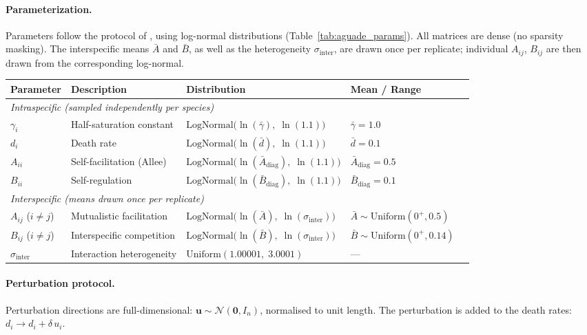 \documentclass[pdflatex,sn-mathphys-num]{sn-jnl}%
\begin{document}
\paragraph{Parameterization.} Parameters follow the protocol of \cite{aguade-gorgorio_taxonomy_2024}, using log-normal distributions (Table~\ref{tab:aguade_params}). All matrices are dense (no sparsity masking). The interspecific means $\bar{A}$ and $\bar{B}$, as well as the heterogeneity $\sigma_{\mathrm{inter}}$, are drawn once per replicate; individual $A_{ij}$, $B_{ij}$ are then drawn from the corresponding log-normal.
\begin{center}
\begin{tabular}{lllll}
\hline
Parameter & Description & Distribution & Mean / Range \\
\hline
\multicolumn{4}{l}{\emph{Intraspecific (sampled independently per species)}} \\
$\gamma_i$ & Half-saturation constant & $\mathrm{LogNormal}\!\bigl(\ln(\bar{\gamma}),\;\ln(1.1)\bigr)$ & $\bar{\gamma} = 1.0$ \\
$d_i$  & Death rate     & $\mathrm{LogNormal}\!\bigl(\ln(\bar{d}),\;\ln(1.1)\bigr)$ & $\bar{d} = 0.1$ \\
$A_{ii}$ & Self-facilitation (Allee) & $\mathrm{LogNormal}\!\bigl(\ln(\bar{A}_{\mathrm{diag}}),\;\ln(1.1)\bigr)$ & $\bar{A}_{\mathrm{diag}} = 0.5$ \\
$B_{ii}$ & Self-regulation   & $\mathrm{LogNormal}\!\bigl(\ln(\bar{B}_{\mathrm{diag}}),\;\ln(1.1)\bigr)$ & $\bar{B}_{\mathrm{diag}} = 0.1$ \\
\hline
\multicolumn{4}{l}{\emph{Interspecific (means drawn once per replicate)}} \\
$A_{ij}$ ($i \neq j$) & Mutualistic facilitation & $\mathrm{LogNormal}\!\bigl(\ln(\bar{A}),\;\ln(\sigma_{\mathrm{inter}})\bigr)$ & $\bar{A} \sim \mathrm{Uniform}(0^+, 0.5)$ \\
$B_{ij}$ ($i \neq j$) & Interspecific competition & $\mathrm{LogNormal}\!\bigl(\ln(\bar{B}),\;\ln(\sigma_{\mathrm{inter}})\bigr)$ & $\bar{B} \sim \mathrm{Uniform}(0^+, 0.14)$ \\
$\sigma_{\mathrm{inter}}$ & Interaction heterogeneity & $\mathrm{Uniform}(1.00001,\;3.0001)$ & — \\
\hline
\end{tabular}
\label{tab:aguade_params}
\end{center}

\paragraph{Perturbation protocol.} Perturbation directions are full-dimensional: $\mathbf{u} \sim \mathcal{N}(\mathbf{0},I_n)$, normalised to unit length. The perturbation is added to the death rates: $d_i \to d_i + \delta\,u_i$.
\end{document}
